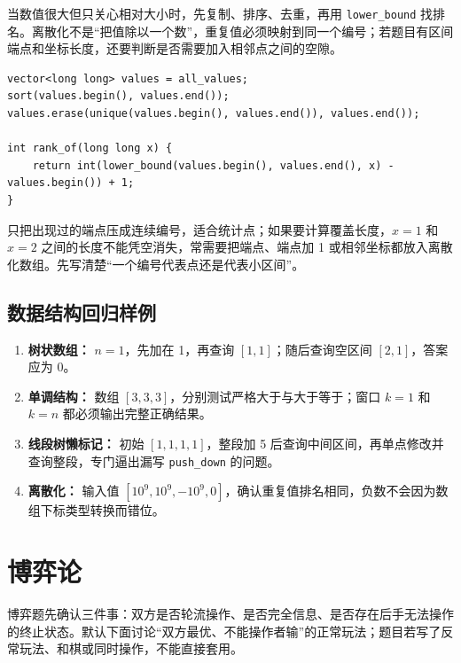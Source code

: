 \documentclass[UTF8,openany,oneside,zihao=-4]{ctexbook}
\begin{document}
当数值很大但只关心相对大小时，先复制、排序、去重，再用 \lstinline|lower_bound| 找排名。离散化不是“把值除以一个数”，重复值必须映射到同一个编号；若题目有区间端点和坐标长度，还要判断是否需要加入相邻点之间的空隙。

\begin{lstlisting}
vector<long long> values = all_values;
sort(values.begin(), values.end());
values.erase(unique(values.begin(), values.end()), values.end());

int rank_of(long long x) {
    return int(lower_bound(values.begin(), values.end(), x) - values.begin()) + 1;
}
\end{lstlisting}

\begin{warn}
 只把出现过的端点压成连续编号，适合统计点；如果要计算覆盖长度，$x=1$ 和 $x=2$ 之间的长度不能凭空消失，常需要把端点、端点加 1 或相邻坐标都放入离散化数组。先写清楚“一个编号代表点还是代表小区间”。
\end{warn}

\section{数据结构回归样例}

\begin{enumerate}
  \item \textbf{树状数组：} $n=1$，先加在 1，再查询 $[1,1]$；随后查询空区间 $[2,1]$，答案应为 0。
  \item \textbf{单调结构：} 数组 $[3,3,3]$，分别测试严格大于与大于等于；窗口 $k=1$ 和 $k=n$ 都必须输出完整正确结果。
  \item \textbf{线段树懒标记：} 初始 $[1,1,1,1]$，整段加 5 后查询中间区间，再单点修改并查询整段，专门逼出漏写 \lstinline|push_down| 的问题。
  \item \textbf{离散化：} 输入值 $[10^9,10^9, -10^9, 0]$，确认重复值排名相同，负数不会因为数组下标类型转换而错位。
\end{enumerate}

\chapter{博弈论}

博弈题先确认三件事：双方是否轮流操作、是否完全信息、是否存在后手无法操作的终止状态。默认下面讨论“双方最优、不能操作者输”的正常玩法；题目若写了反常玩法、和棋或同时操作，不能直接套用。
\end{document}
